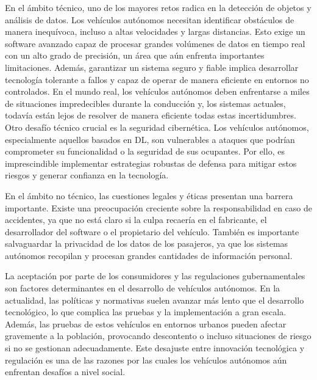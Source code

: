 En el ámbito técnico, uno de los mayores retos radica en la detección de objetos y análisis de datos. Los vehículos autónomos necesitan identificar obstáculos de manera inequívoca, incluso a altas velocidades y largas distancias. Esto exige un software avanzado capaz de procesar grandes volúmenes de datos en tiempo real con un alto grado de precisión, un área que aún enfrenta importantes limitaciones. Además, garantizar un sistema seguro y fiable implica desarrollar tecnología tolerante a fallos y capaz de operar de manera eficiente en entornos no controlados. En el mundo real, los vehículos autónomos deben enfrentarse a miles de situaciones impredecibles durante la conducción y, los sistemas actuales, todavía están lejos de resolver de manera eficiente todas estas incertidumbres. Otro desafío técnico crucial es la seguridad cibernética. Los vehículos autónomos, especialmente aquellos basados en \ac{DL}, son vulnerables a ataques que podrían comprometer su funcionalidad o la seguridad de sus ocupantes. Por ello, es imprescindible implementar estrategias robustas de defensa para mitigar estos riesgos y generar confianza en la tecnología.

En el ámbito no técnico, las cuestiones legales y éticas presentan una barrera importante. Existe una preocupación creciente sobre la responsabilidad en caso de accidentes, ya que no está claro si la culpa recaería en el fabricante, el desarrollador del software o el propietario del vehículo. También es importante salvaguardar la privacidad de los datos de los pasajeros, ya que los sistemas autónomos recopilan y procesan grandes cantidades de información personal.

La aceptación por parte de los consumidores y las regulaciones gubernamentales son factores determinantes en el desarrollo de vehículos autónomos. En la actualidad, las políticas y normativas suelen avanzar más lento que el desarrollo tecnológico, lo que complica las pruebas y la implementación a gran escala. Además, las pruebas de estos vehículos en entornos urbanos pueden afectar gravemente a la población, provocando descontento o incluso situaciones de riesgo si no se gestionan adecuadamente. Este desajuste entre innovación tecnológica y regulación es una de las razones por las cuales los vehículos autónomos aún enfrentan desafíos a nivel social.

